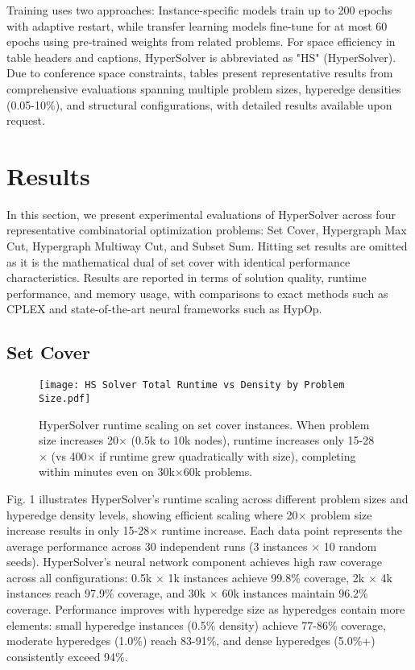 \documentclass[conference]{IEEEtran}
\begin{document}
Training uses two approaches: Instance-specific models train up to 200 epochs with adaptive restart, while transfer learning models fine-tune for at most 60 epochs using pre-trained weights from related problems. 
For space efficiency in table headers and captions, HyperSolver is abbreviated as "HS" (HyperSolver). Due to conference space constraints, tables present representative results from comprehensive evaluations spanning multiple problem sizes, hyperedge densities (0.05-10\%), and structural configurations, with detailed results available upon request.

\section {Results}
In this section, we present experimental evaluations of HyperSolver across four representative combinatorial optimization problems: Set Cover, Hypergraph Max Cut, Hypergraph Multiway Cut, and Subset Sum. Hitting set results are omitted as it is the mathematical dual of set cover with identical performance characteristics. Results are reported in terms of solution quality, runtime performance, and memory usage, with comparisons to exact methods such as CPLEX and state-of-the-art neural frameworks such as HypOp.

\subsection{Set Cover}
\begin{figure}
    \centering
    \texttt{[image: HS Solver Total Runtime vs Density by Problem Size.pdf]}
    \caption{HyperSolver runtime scaling on set cover instances. When problem size increases 20\(\times\) (0.5k to 10k nodes), runtime increases only 15-28\(\times\) (vs 400\(\times\) if runtime grew quadratically with size), completing within minutes even on 30k\(\times\)60k problems.}
    \label{fig:setcover-runtime}
\end{figure}
Fig. 1 illustrates HyperSolver's runtime scaling across different problem sizes and hyperedge density levels, showing efficient scaling where 20\(\times\) problem size increase results in only 15-28\(\times\) runtime increase. Each data point represents the average performance across 30 independent runs (3 instances \(\times\) 10 random seeds). HyperSolver's neural network component achieves high raw coverage across all configurations: 0.5k \(\times\) 1k instances achieve 99.8\% coverage, 2k \(\times\) 4k instances reach 97.9\% coverage, and 30k \(\times\) 60k instances maintain 96.2\% coverage. Performance improves with hyperedge size as hyperedges contain more elements: small hyperedge instances (0.5\% density) achieve 77-86\% coverage, moderate hyperedges (1.0\%) reach 83-91\%, and dense hyperedges (5.0\%+) consistently exceed 94\%.
\end{document}
